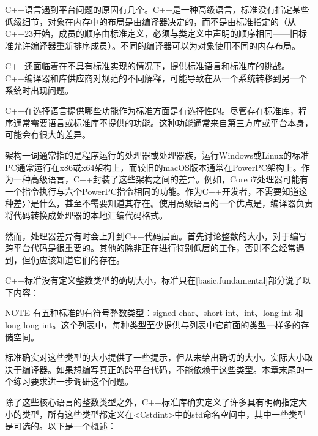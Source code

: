 
C++语言遇到平台问题的原因有几个。C++是一种高级语言，标准没有指定某些低级细节，对象在内存中的布局是由编译器决定的，而不是由标准指定的（从C++23开始，成员的顺序由标准定义，必须与类定义中声明的顺序相同——旧标准允许编译器重新排序成员）。不同的编译器可以为对象使用不同的内存布局。

C++还面临着在不具有标准实现的情况下，提供标准语言和标准库的挑战。C++编译器和库供应商对规范的不同解释，可能导致在从一个系统转移到另一个系统时出现问题。

C++在选择语言提供哪些功能作为标准方面是有选择性的。尽管存在标准库，程序通常需要语言或标准库不提供的功能。这种功能通常来自第三方库或平台本身，可能会有很大的差异。


架构一词通常指的是程序运行的处理器或处理器族，运行Windows或Linux的标准PC通常运行在x86或x64架构上，而较旧的macOS版本通常在PowerPC架构上。作为一种高级语言，C++封装了这些架构之间的差异。例如，Core i7处理器可能有一个指令执行与六个PowerPC指令相同的功能。作为C++开发者，不需要知道这种差异是什么，甚至不需要知道其存在。使用高级语言的一个优点是，编译器负责将代码转换成处理器的本地汇编代码格式。

然而，处理器差异有时会上升到C++代码层面。首先讨论整数的大小，对于编写跨平台代码是很重要的。其他的除非正在进行特别低层的工作，否则不会经常遇到，但仍应该知道它们的存在。


C++标准没有定义整数类型的确切大小，标准只在[basic.fundamental]部分说了以下内容：

\begin{myNotic}{NOTE}
有五种标准的有符号整数类型：signed char、short int、int、long int 和 long long int。这个列表中，每种类型至少提供与列表中它前面的类型一样多的存储空间。
\end{myNotic}

标准确实对这些类型的大小提供了一些提示，但从未给出确切的大小。实际大小取决于编译器。如果想编写真正的跨平台代码，不能依赖于这些类型。本章末尾的一个练习要求进一步调研这个问题。

除了这些核心语言的整数类型之外，C++标准库确实定义了许多具有明确指定大小的类型，所有这些类型都定义在<Cstdint>中的std命名空间中，其中一些类型是可选的。以下是一个概述：

